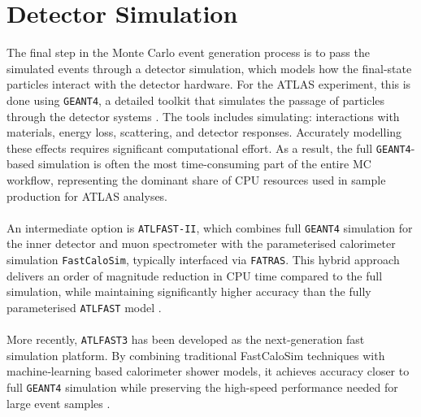 \section{Detector Simulation}
The final step in the Monte Carlo event generation process is to pass the simulated events through a detector simulation, which models how the final-state particles interact with the detector hardware. For the ATLAS experiment, this is done using \verb|GEANT4|, a detailed toolkit that simulates the passage of particles through the detector systems \cite{GEANT4_1,GEANT4_2}. The tools includes simulating: interactions with materials, energy loss, scattering, and detector responses. Accurately modelling these effects requires significant computational effort. As a result, the full \verb|GEANT4|-based simulation is often the most time-consuming part of the entire MC workflow, representing the dominant share of CPU resources used in sample production for ATLAS analyses.\\
\\
An intermediate option is \verb|ATLFAST-II|, which combines full \verb|GEANT4| simulation for the inner detector and muon spectrometer with the parameterised calorimeter simulation \verb|FastCaloSim|, typically interfaced via \verb|FATRAS|. This hybrid approach delivers an order of magnitude reduction in CPU time compared to the full simulation, while maintaining significantly higher accuracy than the fully parameterised \verb|ATLFAST| model \cite{ATLAS2008_LatfastII,ATLAS2010_FastCaloSim,ATLAS2008_FATRAS}.\\
\\
More recently, \verb|ATLFAST3| has been developed as the next-generation fast simulation platform. By combining traditional FastCaloSim techniques with machine‑learning based calorimeter shower models, it achieves accuracy closer to full \verb|GEANT4| simulation while preserving the high-speed performance needed for large event samples \cite{ATLAS2022_AtlFast3}.
